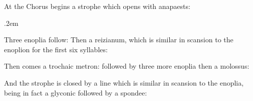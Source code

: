 \documentclass[11pt]{report}
\renewcommand{\(}{\begin{metrike}}
\renewcommand{\)}{\end{metrike}}
\newcommand{\dactyl}{\metra{\m\b\b}}
\newcommand{\spondee}{\metra{\m\m}}
\newcommand{\enoplion}{\metra{\m\m\b\b\m\b\m\m}}
\begin{document}
At  the Chorus begins a strophe which opens with
anapaests:\par
\vspace{1ex}
{%
\tabskip .2em %
\halign {%
\hspace*{2em}#\hspace*{4em}&&#\hfill\cr%
\oldstylenums{148}&\dactyl &\spondee &\spondee &\spondee \cr
&\spondee &\spondee &\spondee &\spondee\cr
&\spondee &\spondee \cr
}%
}

Three enoplia follow:{\obeylines
\hspace{6.25em}\enoplion
\hspace{6.25em}\enoplion
\hspace{6.25em}\enoplion
}
Then a reizianum, which is similar in scansion to the enoplion
for the first six syllables:{\obeylines
\hspace{6.25em}\metra{\m\m\b\b\m\m}
}

Then comes a trochaic metron:{\obeylines
\hspace{6.25em}\metra{\m\b\m\b}
}\noindent followed by three more enoplia{\obeylines
\hspace{6.25em}\enoplion
\hspace{6.25em}\enoplion
\hspace{6.25em}\enoplion
}\noindent then a molossus:{\obeylines
\hspace{6.25em}\metra{\m\m\m}
}

And the strophe is closed by a line which is similar in scansion to
the enoplia, being in fact a glyconic followed by a spondee:{\obeylines
\hspace{6.25em}\metra{\m\m\m\b\b\m\b\m\m\m}
}
\end{document}
